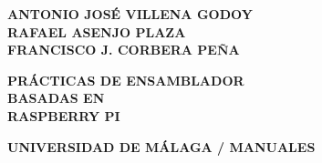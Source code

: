 \documentclass[12pt,a4paper]{book} %
\begin{document}
\frontmatter

\thispagestyle{empty}

\begin{center}
\small \bf
 ANTONIO JOSÉ VILLENA GODOY\\[0.1cm]
 RAFAEL ASENJO PLAZA\\[0.1cm]
 FRANCISCO J. CORBERA PEÑA\\[0.1cm]
\vfill

{\Large \bf PRÁCTICAS DE ENSAMBLADOR \\[0.1cm] BASADAS EN \\[0.4cm] RASPBERRY PI}

\vfill

\vfill

{\normalsize \bf UNIVERSIDAD DE MÁLAGA / MANUALES}
\end{center}










\mainmatter












\appendix









\backmatter


\end{document}
